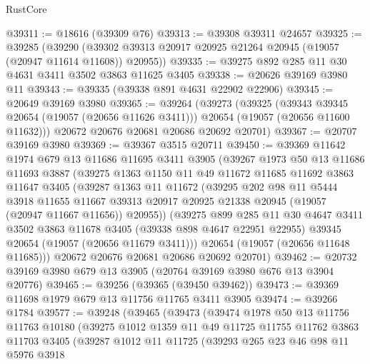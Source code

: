 \begin{lexlean}{RustCore}
\begin{coremodule}
@39311 := @18616 (@39309 @76)
@39313 := @39308 @39311 @24657
@39325 := @39285
    (@39290 (@39302 @39313 @20917 @20925 @21264 @20945 (@19057 (@20947 @11614 @11608)) @20955))
@39335 := @39275 @892 @285 @11 @30 @4631 @3411 @3502 @3863 @11625 @3405
@39338 := @20626 @39169 @3980 @11
@39343 := @39335 (@39338 @891 @4631 @22902 @22906)
@39345 := @20649 @39169 @3980
@39365 := @39264
    (@39273
      (@39325
        (@39343 @39345 @20654 (@19057 (@20656 @11626 @3411)))
        @20654
        (@19057 (@20656 @11600 @11632)))
      @20672
      @20676
      @20681
      @20686
      @20692
      @20701)
@39367 := @20707 @39169 @3980
@39369 := @39367 @3515 @20711
@39450 := @39369
    @11642
    @1974
    @679
    @13
    @11686
    @11695
    @3411
    @3905
    (@39267
      @1973
      @50
      @13
      @11686
      @11693
      @3887
      (@39275
        @1363
        @1150
        @11
        @49
        @11672
        @11685
        @11692
        @3863
        @11647
        @3405
        (@39287
          @1363
          @11
          @11672
          (@39295
            @202
            @98
            @11
            @5444
            @3918
            @11655
            @11667
            @39313
            @20917
            @20925
            @21338
            @20945
            (@19057 (@20947 @11667 @11656))
            @20955))
        (@39275
          @899
          @285
          @11
          @30
          @4647
          @3411
          @3502
          @3863
          @11678
          @3405
          (@39338 @898 @4647 @22951 @22955)
          @39345
          @20654
          (@19057 (@20656 @11679 @3411)))
        @20654
        (@19057 (@20656 @11648 @11685)))
      @20672
      @20676
      @20681
      @20686
      @20692
      @20701)
@39462 := @20732 @39169 @3980 @679 @13 @3905 (@20764 @39169 @3980 @676 @13 @3904 @20776)
@39465 := @39256 (@39365 (@39450 @39462))
@39473 := @39369 @11698 @1979 @679 @13 @11756 @11765 @3411 @3905
@39474 := @39266 @1784
@39577 := @39248
    (@39465
      (@39473
        (@39474
          @1978
          @50
          @13
          @11756
          @11763
          @10180
          (@39275
            @1012
            @1359
            @11
            @49
            @11725
            @11755
            @11762
            @3863
            @11703
            @3405
            (@39287
              @1012
              @11
              @11725
              (@39293
                @265
                @23
                @46
                @98
                @11
                @5976
                @3918

\end{coremodule}
\end{lexlean}
